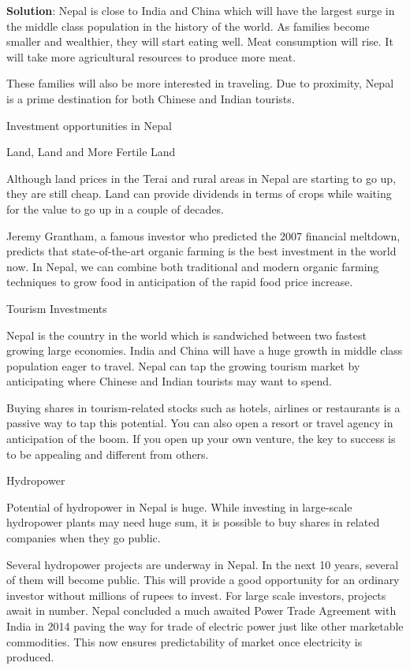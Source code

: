\documentclass[
]{book}
\newenvironment{solution}{ {\bfseries Solution}:}{}
\begin{document}
\begin{questions}
\begin{solution}
Nepal is close to India and China which will have the largest surge in the middle class population in the history of the world. As families become smaller and wealthier, they will start eating well. Meat consumption will rise. It will take more agricultural resources to produce more meat.

These families will also be more interested in traveling. Due to proximity, Nepal is a prime destination for both Chinese and Indian tourists.

Investment opportunities in Nepal

Land, Land and More Fertile Land

Although land prices in the Terai and rural areas in Nepal are starting to go up, they are still cheap. Land can provide dividends in terms of crops while waiting for the value to go up in a couple of decades.

Jeremy Grantham, a famous investor who predicted the 2007 financial meltdown, predicts that state-of-the-art organic farming is the best investment in the world now. In Nepal, we can combine both traditional and modern organic farming techniques to grow food in anticipation of the rapid food price increase.

Tourism Investments

Nepal is the country in the world which is sandwiched between two fastest growing large economies. India and China will have a huge growth in middle class population eager to travel. Nepal can tap the growing tourism market by anticipating where Chinese and Indian tourists may want to spend.

Buying shares in tourism-related stocks such as hotels, airlines or restaurants is a passive way to tap this potential. You can also open a resort or travel agency in anticipation of the boom. If you open up your own venture, the key to success is to be appealing and different from others.

Hydropower

Potential of hydropower in Nepal is huge. While investing in large-scale hydropower plants may need huge sum, it is possible to buy shares in related companies when they go public.

Several hydropower projects are underway in Nepal. In the next 10 years, several of them will become public. This will provide a good opportunity for an ordinary investor without millions of rupees to invest. For large scale investors, projects await in number. Nepal concluded a much awaited Power Trade Agreement with India in 2014 paving the way for trade of electric power just like other marketable commodities. This now ensures predictability of market once electricity is produced.


\end{solution}
\end{questions}
\end{document}
